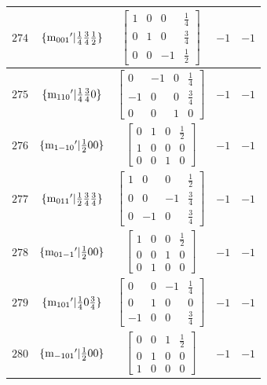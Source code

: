 \documentclass[fleqn,8pt]{jsarticle}
\begin{document}
\begin{longtable}{ccccc}
$ 274 $ & $ \{{\rm m}_{001}{}'|\frac{1}{4} \frac{3}{4} \frac{1}{2}\} $ & $ \begin{bmatrix} 1 & 0 & 0 & \frac{1}{4} \\ 0 & 1 & 0 & \frac{3}{4} \\ 0 & 0 & -1 & \frac{1}{2} \end{bmatrix} $ & $ -1 $ & $ -1 $ \\ \hline
$ 275 $ & $ \{{\rm m}_{110}{}'|\frac{1}{4} \frac{3}{4} 0\} $ & $ \begin{bmatrix} 0 & -1 & 0 & \frac{1}{4} \\ -1 & 0 & 0 & \frac{3}{4} \\ 0 & 0 & 1 & 0 \end{bmatrix} $ & $ -1 $ & $ -1 $ \\ \hline
$ 276 $ & $ \{{\rm m}_{1-10}{}'|\frac{1}{2} 0 0\} $ & $ \begin{bmatrix} 0 & 1 & 0 & \frac{1}{2} \\ 1 & 0 & 0 & 0 \\ 0 & 0 & 1 & 0 \end{bmatrix} $ & $ -1 $ & $ -1 $ \\ \hline
$ 277 $ & $ \{{\rm m}_{011}{}'|\frac{1}{2} \frac{3}{4} \frac{3}{4}\} $ & $ \begin{bmatrix} 1 & 0 & 0 & \frac{1}{2} \\ 0 & 0 & -1 & \frac{3}{4} \\ 0 & -1 & 0 & \frac{3}{4} \end{bmatrix} $ & $ -1 $ & $ -1 $ \\ \hline
$ 278 $ & $ \{{\rm m}_{01-1}{}'|\frac{1}{2} 0 0\} $ & $ \begin{bmatrix} 1 & 0 & 0 & \frac{1}{2} \\ 0 & 0 & 1 & 0 \\ 0 & 1 & 0 & 0 \end{bmatrix} $ & $ -1 $ & $ -1 $ \\ \hline
$ 279 $ & $ \{{\rm m}_{101}{}'|\frac{1}{4} 0 \frac{3}{4}\} $ & $ \begin{bmatrix} 0 & 0 & -1 & \frac{1}{4} \\ 0 & 1 & 0 & 0 \\ -1 & 0 & 0 & \frac{3}{4} \end{bmatrix} $ & $ -1 $ & $ -1 $ \\ \hline
$ 280 $ & $ \{{\rm m}_{-101}{}'|\frac{1}{2} 0 0\} $ & $ \begin{bmatrix} 0 & 0 & 1 & \frac{1}{2} \\ 0 & 1 & 0 & 0 \\ 1 & 0 & 0 & 0 \end{bmatrix} $ & $ -1 $ & $ -1 $ \\ \hline

\end{longtable}
\end{document}
